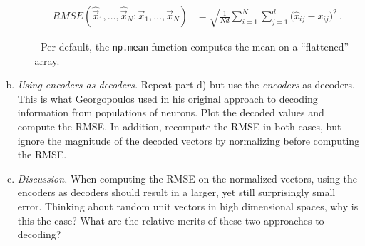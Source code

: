 \begin{enumerate}[a)]
\begin{itemize}
\begin{align*}
				\mathit{RMSE}(\hat{\vec x}_1, \ldots, \hat{\vec x}_N; \vec x_1, \ldots, \vec x_N)
					&= \sqrt{ \frac{1}{Nd} \sum_{i=1}^N \sum_{j=1}^d \big({\hat x}_{i j} - x_{ij}\big)^2 } \,.
			\end{align*}
			\item[{\symbolfont 🐍}] Per default, the \texttt{np.mean} function computes the mean on a \enquote{flattened} array.
		\end{itemize}
		\item {} \textit{Using encoders as decoders.} Repeat part d) but use the \textit{encoders} as decoders. This is what Georgopoulos used in his original approach to decoding information from populations of neurons. Plot the decoded values and compute the RMSE. In addition, recompute the RMSE in both cases, but ignore the magnitude of the decoded vectors by normalizing before computing the RMSE.
		\item {} \textit{Discussion.} When computing the RMSE on the normalized vectors, using the encoders as decoders should result in a larger, yet still surprisingly small error. Thinking about random unit vectors in high dimensional spaces, why is this the case? What are the relative merits of these two approaches to decoding?
	\end{enumerate}


